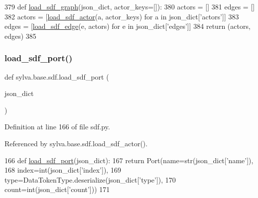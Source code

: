 \begin{DoxyCode}
379     \textcolor{keyword}{def }\hyperlink{namespacesylva_1_1base_1_1sdf_a0bdfa7a81bf9648662631113a609062d}{load\_sdf\_graph}(json\_dict, actor\_keys=[]):
380         actors = []
381         edges = []
382         actors = [\hyperlink{namespacesylva_1_1base_1_1sdf_a14b2bfbb0fd81d1e114b670f13f718f1}{load\_sdf\_actor}(a, actor\_keys) \textcolor{keywordflow}{for} a \textcolor{keywordflow}{in} json\_dict[\textcolor{stringliteral}{'actors'}]]
383         edges = [\hyperlink{namespacesylva_1_1base_1_1sdf_acd1ba464e47476a5205de3e3856fbb83}{load\_sdf\_edge}(e, actors) \textcolor{keywordflow}{for} e \textcolor{keywordflow}{in} json\_dict[\textcolor{stringliteral}{'edges'}]]
384         \textcolor{keywordflow}{return} (actors, edges)
385 
\end{DoxyCode}
\mbox{\label{namespacesylva_1_1base_1_1sdf_a72bbd0e1cd0a666269ac3f17427954b8}} 
\subsubsection{\texorpdfstring{load\+\_\+sdf\+\_\+port()}{load\_sdf\_port()}}
{\footnotesize\ttfamily def sylva.\+base.\+sdf.\+load\+\_\+sdf\+\_\+port (\begin{DoxyParamCaption}\item[{}]{json\+\_\+dict }\end{DoxyParamCaption})}



Definition at line 166 of file sdf.\+py.



Referenced by sylva.\+base.\+sdf.\+load\+\_\+sdf\+\_\+actor().


\begin{DoxyCode}
166 \textcolor{keyword}{def }\hyperlink{namespacesylva_1_1base_1_1sdf_a72bbd0e1cd0a666269ac3f17427954b8}{load\_sdf\_port}(json\_dict):
167     \textcolor{keywordflow}{return} Port(name=str(json\_dict[\textcolor{stringliteral}{'name'}]),
168                 index=int(json\_dict[\textcolor{stringliteral}{'index'}]),
169                 type=DataTokenType.deserialize(json\_dict[\textcolor{stringliteral}{'type'}]),
170                 count=int(json\_dict[\textcolor{stringliteral}{'count'}]))
171 
\end{DoxyCode}
\mbox{\label{namespacesylva_1_1base_1_1sdf_a34a38a5853d86a6e49aba53f9040462d}} 
